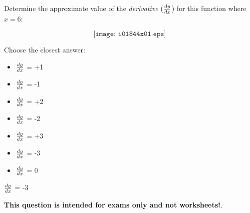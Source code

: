 

Determine the approximate value of the {\it derivative} ($dy \over dx$) for this function where $x=6$:

$$\texttt{[image: i01844x01.eps]}$$

Choose the closest answer:

\begin{itemize}
\item{} $dy \over dx$ = +1
\vskip 10pt 
\item{} $dy \over dx$ = -1
\vskip 10pt 
\item{} $dy \over dx$ = +2
\vskip 10pt 
\item{} $dy \over dx$ = -2
\vskip 10pt 
\item{} $dy \over dx$ = +3
\vskip 10pt 
\item{} $dy \over dx$ = -3
\vskip 10pt 
\item{} $dy \over dx$ = 0
\end{itemize}







$dy \over dx$ = -3







{\bf This question is intended for exams only and not worksheets!}.



